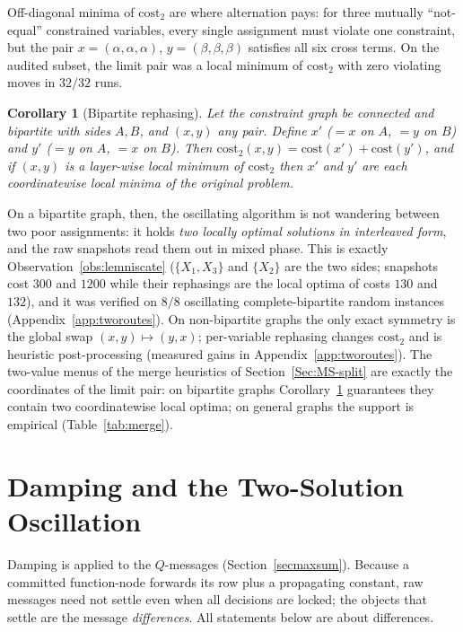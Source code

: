\documentclass[letterpaper]{article} %
\newtheorem{corollary}[theorem]{Corollary}
\theoremstyle{definition}
\theoremstyle{remark}
\begin{document}
Off-diagonal minima of $\mathrm{cost}_2$ are where alternation pays: for
three mutually ``not-equal'' constrained variables, every single
assignment must violate one constraint, but the pair
$x = (\alpha,\alpha,\alpha)$, $y = (\beta,\beta,\beta)$ satisfies all six
cross terms.  On the audited subset, the limit pair was a local minimum
of $\mathrm{cost}_2$ with zero violating moves in $32/32$ runs.

\begin{corollary}[Bipartite rephasing]\label{cor:bipartite}
Let the constraint graph be connected and bipartite with sides $A, B$,
and $(x,y)$ any pair.  Define $x'$ ($=x$ on $A$, $=y$ on $B$) and $y'$
($=y$ on $A$, $=x$ on $B$).  Then
$\mathrm{cost}_2(x, y) = \mathrm{cost}(x') + \mathrm{cost}(y')$, and if
$(x,y)$ is a layer-wise local minimum of $\mathrm{cost}_2$ then $x'$ and
$y'$ are each coordinatewise local minima of the \emph{original} problem.
\end{corollary}

On a bipartite graph, then, the oscillating algorithm is not wandering
between two poor assignments: it holds \emph{two locally optimal
solutions in interleaved form}, and the raw snapshots read them out in
mixed phase.  This is exactly Observation~\ref{obs:lemniscate}
($\{X_1, X_3\}$ and $\{X_2\}$ are the two sides; snapshots cost $300$ and
$1200$ while their rephasings are the local optima of costs $130$ and
$132$), and it was verified on $8/8$ oscillating complete-bipartite
random instances (Appendix~\ref{app:tworoutes}).  On non-bipartite graphs
the only exact symmetry is the global swap $(x,y)\mapsto(y,x)$;
per-variable rephasing changes $\mathrm{cost}_2$ and is heuristic
post-processing (measured gains in Appendix~\ref{app:tworoutes}).  The
two-value menus of the merge heuristics of Section~\ref{Sec:MS-split} are
exactly the coordinates of the limit pair: on bipartite graphs
Corollary~\ref{cor:bipartite} guarantees they contain two coordinatewise
local optima; on general graphs the support is empirical
(Table~\ref{tab:merge}).

\section{Damping and the Two-Solution Oscillation}\label{sec:whydamping}

Damping is applied to the $Q$-messages
(Section~\ref{secmaxsum}).  Because a committed function-node forwards
its row plus a propagating constant, raw messages need not settle even
when all decisions are locked; the objects that settle are the message
\emph{differences}.  All statements below are about differences.
\end{document}
